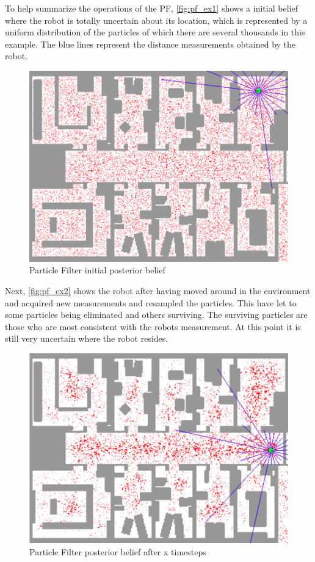 To help summarize the operations of the PF, \autoref{fig:pf_ex1} shows a initial belief where the robot is totally uncertain about its location, which is represented by a uniform distribution of the particles of which there are several thousands in this example. The blue lines represent the distance measurements obtained by the robot.

\begin{figure}[H]
\centering
\includegraphics[scale=0.35]{images/particlefilter1}
\caption{Particle Filter initial posterior belief}
\label{fig:pf_ex1}
\end{figure}

Next, \autoref{fig:pf_ex2} shows the robot after having moved around in the environment and acquired new measurements and resampled the particles. This have let to some particles being eliminated and others surviving. The surviving particles are those who are most consistent with the robots measurement. At this point it is still very uncertain where the robot resides.

\begin{figure}[H]
\centering
\includegraphics[scale=0.35]{images/particlefilter2}
\caption{Particle Filter posterior belief after x timesteps}
\label{fig:pf_ex2}
\end{figure}

